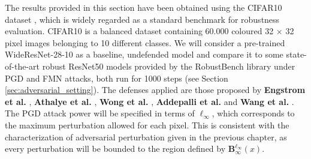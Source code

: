 \begin{experiment}
The results provided in this section have been obtained using the CIFAR10 dataset
\cite{krizhevskyLearningMultipleLayers},
which is widely regarded as a standard benchmark for robustness evaluation. CIFAR10 is
a balanced dataset containing 60.000 coloured 32 $\times$ 32 pixel images belonging to 10
different classes. We will consider a pre-trained WideResNet-28-10
\cite{BMVC2016_87}
as a baseline, undefended model and compare it to some state-of-the-art robust ResNet50
\cite{resnet50}
models provided by the 
RobustBench \cite{croceRobustBenchStandardizedAdversarial2021a}
library under PGD \cite{madryDeepLearningModels2019}
and FMN \cite{pintorFastMinimumnormAdversarial2021}
attacks, both run for 1000 steps (see Section \ref{sec:adversarial_setting}).
The defenses applied are those proposed by 
{\color{tab:blue} \textbf{Engstrom et al.}} \cite{engstrom2019adversarial}, 
{\color{tab:green} \textbf{Athalye et al.}} \cite{AthalyeC018}, 
{\color{tab:red} \textbf{Wong et al.}} \cite{WongRK20}, 
{\color{tab:purple} \textbf{Addepalli et al.}} \cite{Addepalli2022ScalingAT}
and {\color{tab:brown} \textbf{Wang et al.}} \cite{wang2023betterdiffusionmodelsimprove}.
The PGD attack power will be specified in terms of $\ell_\infty$, which corresponds
to the maximum perturbation allowed for each pixel. This is consistent with the characterization
of adversarial perturbation given in the previous chapter, as every perturbation will be bounded
to the region defined by $\mathbf{B}_\infty^{\ell_{\infty}} (x)$.
\end{experiment}

